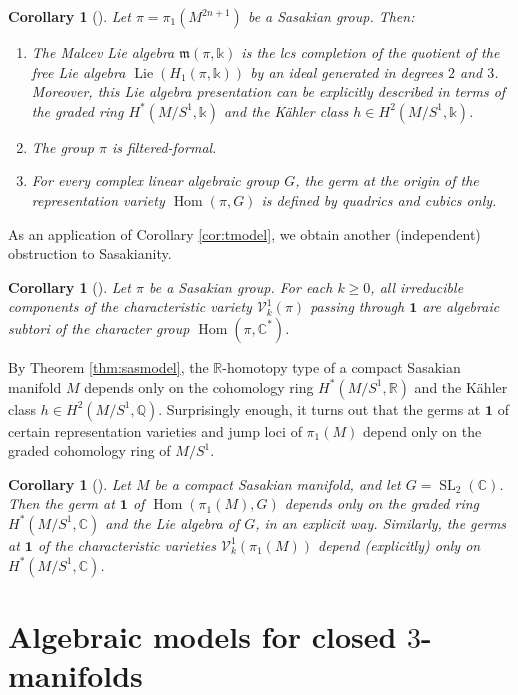 \documentclass{article}
\numberwithin{equation}{section}
\newtheorem{corollary}[theorem]{Corollary}
\theoremstyle{definition}
\newcommand{\Q}{\mathbb{Q}}
\newcommand{\R}{\mathbb{R}}
\renewcommand{\C}{\mathbb{C}}
\renewcommand{\k}{\mathbb{k}}
\newcommand{\VV}{\mathcal{V}}
\newcommand{\m}{{\mathfrak{m}}}
\DeclareMathOperator{\SL}{SL}
\DeclareMathOperator{\Hom}{{Hom}}
\DeclareMathOperator{\Lie}{Lie}
\newcommand{\one}{\mathbf{1}}
\begin{document}
\begin{corollary}[\cite{PS-imrn19}]
\label{cor:sasobstr}
Let $\pi= \pi_1 (M^{2n+1})$ be a Sasakian group.  Then:
\begin{enumerate}
\item \label{s1}
The Malcev Lie algebra $\m(\pi, \k)$ is the lcs completion of the 
quotient of the free Lie algebra $\Lie (H_1(\pi, \k))$ by an ideal 
generated in degrees $2$ and $3$.  
Moreover, this Lie algebra presentation can be explicitly described in
terms of the graded ring $H^{*}(M/S^1, \k)$ and the K\"ahler class 
$h\in H^{2}(M/S^1, \k)$.
\item \label{s2}
The group $\pi$ is filtered-formal. 
\item \label{s3}
For every complex linear algebraic group $G$,
the germ at the origin of the representation variety $\Hom(\pi, G)$ 
is defined by quadrics and cubics only.
\end{enumerate}
\end{corollary}

As an application of Corollary \ref{cor:tmodel}, we obtain 
another (independent) obstruction to Sasakianity. 

\begin{corollary}[\cite{PS-imrn19}]
\label{cor:sasgpobs}
Let $\pi$ be a Sasakian group. 
For each $k\ge 0$, all irreducible components 
of the characteristic variety $\VV^1_k(\pi)$ passing through $\one$ 
are algebraic subtori of the character group $\Hom(\pi,\C^*)$.
\end{corollary}

By Theorem \ref{thm:sasmodel}, the $\R$-homotopy type of a 
compact Sasakian manifold $M$ depends only on the cohomology ring 
$H^{*}(M/S^1, \R)$ and the K\"{a}hler class $h\in H^2(M/S^1,\Q)$. 
Surprisingly enough, it turns out that the germs at $\one$ of certain representation 
varieties and jump loci of $\pi_1(M)$ depend only on the graded cohomology 
ring of $M/S^1$. 

\begin{corollary}[\cite{PS-imrn19}]
\label{cor:nokclass}
Let $M$ be a compact Sasakian manifold, and let $G=\SL_2(\C)$.  
Then the germ at $\one$ of $\Hom(\pi_1(M), G)$ depends only on the 
graded ring $H^{*}(M/S^1, \C)$ and the Lie algebra of $G$, 
in an explicit way. Similarly, the germs at $\one$ of the characteristic 
varieties $\VV^1_k(\pi_1(M))$ depend (explicitly) only on  $H^{*}(M/S^1, \C)$. 
\end{corollary}

\section{Algebraic models for closed $3$-manifolds}
\label{sect:models-3d}
\end{document}
